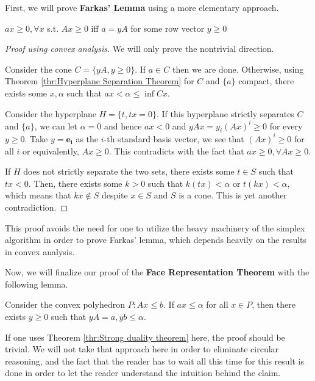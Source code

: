 First, we will prove \textbf{Farkas' Lemma} using a more elementary approach.

\begin{lemma}
  \( ax \ge  0, \forall  x \) s.t. \( Ax \ge  0 \) iff \( a = yA \) for some
  row vector \( y \ge  0 \)
\end{lemma}

\begin{proof}[Proof using convex analysis]
  We will only prove the nontrivial direction.

  Consider the cone \( C = \{yA, y \ge 0\}   \). If \( a \in C \) then we are
  done. Otherwise, using Theorem \ref{thr:Hyperplane Separation Theorem} for \(
  C\) and \( \{a\}   \) compact, there exists some \( x, \alpha \) such that \(
  ax < \alpha \le  \inf Cx\).

  Consider the hyperplane \( H = \{t, tx = 0\}   \). If this hyperplane
  strictly separates \( C \) and \( \{a\}   \), we can let \( \alpha = 0 \) and
  hence \( ax < 0 \) and \( yAx = y_{i}(Ax)^{i} \ge 0 \) for every \( y \ge 0
  \). Take \( y = \mathbf{e_{i}} \) as the \( i \)-th standard basis vector, we
  see that \( (Ax)^{i} \ge 0 \) for all \( i \) or equivalently, \( Ax \ge 0 \).
  This contradicts with the fact that \( ax \ge 0, \forall Ax \ge 0 \).

  If \( H \) does not strictly separate the two sets, there exists some \( t \in
  S\) such that \( tx < 0 \). Then, there exists some \( k > 0 \) such that \(
  k(tx) < \alpha \) or \( t(kx) < \alpha \), which means that \( kx \notin S \)
  despite \( x \in S \) and \( S \) is a cone. This is yet another
  contradiction.
\end{proof}

This proof avoids the need for one to utilize the heavy machinery of the simplex
algorithm in order to prove Farkas' lemma, which depends heavily on the results
in convex analysis.

Now, we will finalize our proof of the \textbf{Face Representation Theorem} with
the following lemma.

\begin{lemma}
\label{lem:Forms of valid inequalities}
  Consider the convex polyhedron \( P: Ax \le b \). If \( ax \le \alpha \) for
  all \( x \in P \), then there exists \( y \ge 0 \) such that \( yA = a, yb \le 
  \alpha \).
\end{lemma}

If one uses Theorem \ref{thr:Strong duality theorem} here, the proof should be
trivial. We will not take that approach here in order to eliminate circular
reasoning, and the fact that the reader has to wait all this time for this
result is done in order to let the reader understand the
intuition behind the claim.

